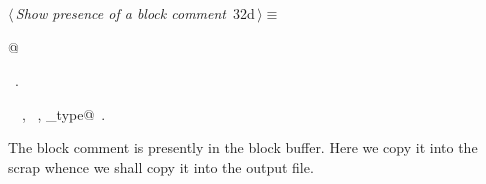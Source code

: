 \documentclass[a4paper]{report}
\begin{document}
\begin{flushleft} \small
\begin{minipage}{\linewidth}\label{scrap57}\raggedright\small
{} $\langle\,${\it Show presence of a block comment}\nobreak\ {\footnotesize {32d}}$\,\rangle\equiv$
\vspace{-1ex}
\begin{list}{}{} \item
\mbox{}@\\
\mbox{}\verb@@{\NWsep}
\end{list}
\vspace{-1.5ex}
\footnotesize
\begin{list}{}{\setlength{\itemsep}{-\parsep}\setlength{\itemindent}{-\leftmargin}}
\item \NWtxtMacroRefIn\ .
\item \NWtxtIdentsUsed\nobreak\  \verb@fprintf@\nobreak\ , \verb@fputs@\nobreak\ , \verb@scrap_type@\nobreak\ .
\item{}
\end{list}
\end{minipage}\vspace{4ex}
\end{flushleft}
The block comment is presently in the block buffer. Here we
copy it into the scrap whence we shall copy it into the output
file.
\end{document}
